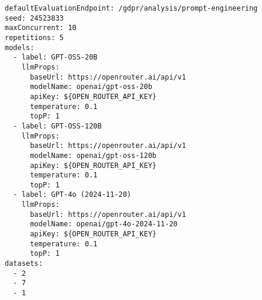 \begin{lstlisting}[caption={Konfigurationsdatei vom Experiment mit GPT Modellen}, label={lst:gpt-experiment-config}]
defaultEvaluationEndpoint: /gdpr/analysis/prompt-engineering
seed: 24523833
maxConcurrent: 10
repetitions: 5
models:
  - label: GPT-OSS-20B
    llmProps:
      baseUrl: https://openrouter.ai/api/v1
      modelName: openai/gpt-oss-20b
      apiKey: ${OPEN_ROUTER_API_KEY}
      temperature: 0.1
      topP: 1
  - label: GPT-OSS-120B
    llmProps:
      baseUrl: https://openrouter.ai/api/v1
      modelName: openai/gpt-oss-120b
      apiKey: ${OPEN_ROUTER_API_KEY}
      temperature: 0.1
      topP: 1
  - label: GPT-4o (2024-11-20)
    llmProps:
      baseUrl: https://openrouter.ai/api/v1
      modelName: openai/gpt-4o-2024-11-20
      apiKey: ${OPEN_ROUTER_API_KEY}
      temperature: 0.1
      topP: 1
datasets:
  - 2
  - 7
  - 1
\end{lstlisting}
